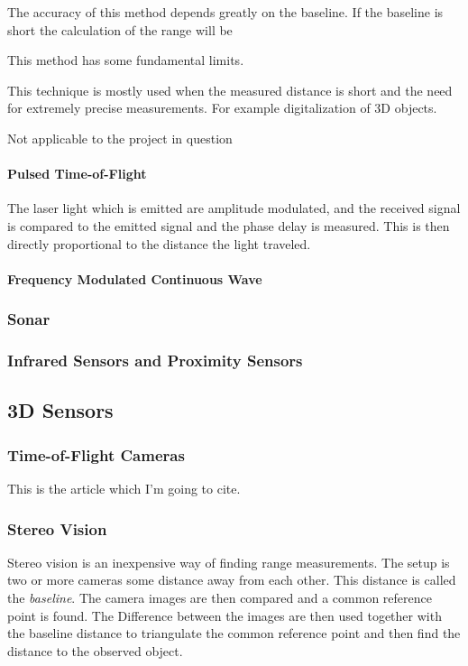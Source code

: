 The accuracy of this method depends greatly on the baseline. If the baseline is short the
calculation of the range will be 

This method has some fundamental limits. \cite{laser-ranging-critical-review} 

This technique is mostly used when the measured distance is short and the need for
extremely precise measurements. For example digitalization of 3D objects. 

Not applicable to the project in question


\paragraph{Pulsed Time-of-Flight}
The laser light which is emitted are amplitude modulated, and the received signal is
compared to the emitted signal and the phase delay is measured. This is then directly
proportional to the distance the light traveled. 


\paragraph{Frequency Modulated Continuous Wave}




\subsubsection{Sonar}


\subsubsection{Infrared Sensors and Proximity Sensors}


\subsection{3D Sensors}


\subsubsection{Time-of-Flight Cameras}
This is the article which I'm going to cite. \cite{sr3000}



\subsubsection{Stereo Vision}
Stereo vision is an inexpensive way of finding range measurements. The setup is two or
more cameras some distance away from each other. This distance is called the
\emph{baseline}. The camera images are then compared and a common reference point is
found. The Difference between the images are then used together with the baseline distance
to triangulate the common reference point and then find the distance to the observed
object. 



